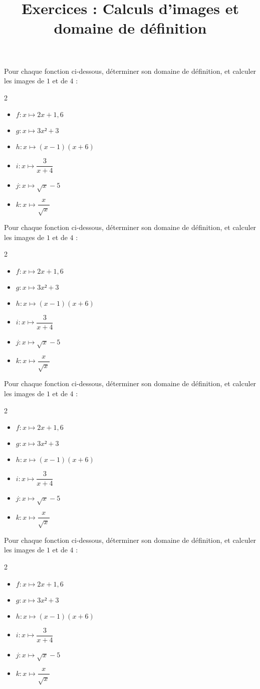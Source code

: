 \documentclass[
	classe=$2^{de}$,
	noheader
]{exercice}
\title{Exercices : Calculs d'images et domaine de définition}
\begin{document}
\newcommand{\Exercice}{
	\maketitle

	Pour chaque fonction ci-dessous, déterminer son domaine de définition, et calculer les images de $1$ et de $4$ :

	\begin{multicols}{2}
		\begin{itemize}
			\setlength{\itemsep}{0.8em}
			\item $f : x ↦ 2x + 1,6$
			\item $g : x ↦ 3x² + 3$
			\item $h : x ↦ (x - 1)(x + 6)$
			\item $i : x ↦ \dfrac{3}{x + 4}$
			\item $j : x ↦ \sqrt{x} - 5$
			\item $k : x ↦ \dfrac{x}{\sqrt{x}}$
		\end{itemize}
	\end{multicols}
}

\Exercice

\vfill

\Exercice

\vfill

\Exercice

\vfill

\Exercice
\end{document}
